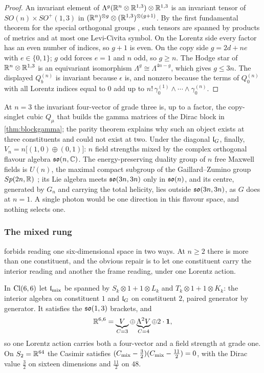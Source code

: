 \begin{proof}
An invariant element of $\Lambda^g(\mathbb{R}^n\otimes\mathbb{R}^{1,3})\otimes\mathbb{R}^{1,3}$ is an invariant tensor of $SO(n)\times SO^+(1,3)$ in
$(\mathbb{R}^n)^{\otimes g}\otimes(\mathbb{R}^{1,3})^{\otimes(g+1)}$. By the first fundamental theorem for the special orthogonal groups \cite{Weyl39},
such tensors are spanned by products of metrics and at most one Levi-Civita symbol. On the Lorentz side every factor has an even number
of indices, so $g+1$ is even. On the copy side $g=2d+ne$ with $e\in\{0,1\}$; $g$ odd forces $e=1$ and $n$ odd, so $g\ge n$. The Hodge
star of $\mathbb{R}^n\otimes\mathbb{R}^{1,3}$ is an equivariant isomorphism $\Lambda^g\cong\Lambda^{4n-g}$, which gives $g\le3n$. The displayed
$Q^{(n)}_b$ is invariant because $\epsilon$ is, and nonzero because the terms of $Q^{(n)}_0$ with all Lorentz indices equal to $0$
add up to $n!\,\gamma^{(1)}_0\wedge\cdots\wedge\gamma^{(n)}_0$.
\end{proof}

At $n=3$ the invariant four-vector of grade three is, up to a factor, the copy-singlet cubic $Q_\mu$ that builds the gamma matrices of
the Dirac block in \cref{thm:blockgamma}; the parity theorem explains why such an object exists at three constituents and could not
exist at two. Under the diagonal $\mathfrak l_G$, finally, $V_n=n\bigl[(1,0)\oplus(0,1)\bigr]$: $n$ field strengths mixed by the complex orthogonal
flavour algebra $\mathfrak{so}(n,\mathbb{C})$. The energy-preserving duality group of $n$ free Maxwell fields is $U(n)$, the maximal compact subgroup of
the Gaillard--Zumino group $Sp(2n,\mathbb{R})$ \cite{GaillardZumino81}; its Lie algebra meets $\mathfrak{so}(3n,3n)$ only in $\mathfrak{so}(n)$, and its centre,
generated by $G_n$ and carrying the total helicity, lies outside $\mathfrak{so}(3n,3n)$, as $G$ does at $n=1$. A single photon would be one
direction in this flavour space, and nothing selects one.

\subsubsection{The mixed rung}
\label{sec:mixed}

 forbids reading one six-dimensional space in two ways. At $n\ge2$ there is more than one constituent, and the
obvious repair is to let one constituent carry the interior reading and another the frame reading, under one Lorentz action.

\begin{proposition}
\label{prop:mixed}
In $\mathrm{Cl}(6,6)$ let $\mathfrak l_{\rm mix}$ be spanned by $S_k\otimes1+1\otimes L_k$ and $T_k\otimes1+1\otimes K_k$: the interior algebra on
constituent $1$ and $\mathfrak l_G$ on constituent $2$, paired generator by generator. It satisfies the $\mathfrak{so}(1,3)$ brackets, and
\[
\mathbb{R}^{6,6}=\underbrace{V}_{C=3}\oplus\underbrace{\Lambda^2V}_{C=4}\oplus2\cdot\mathbf1 ,
\]
so one Lorentz action carries both a four-vector and a field strength at grade one. On $S_2=\mathbb{R}^{64}$ the Casimir satisfies
$(C_{\rm mix}-\tfrac32)(C_{\rm mix}-\tfrac{11}2)=0$, with the Dirac value $\tfrac32$ on sixteen dimensions and $\tfrac{11}2$ on $48$.
\end{proposition}

